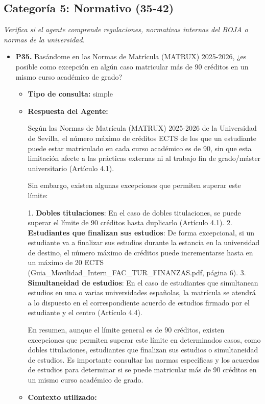 \documentclass{article}
\begin{document}
\subsection{Categoría 5: Normativo (35-42)}
\textit{Verifica si el agente comprende regulaciones, normativas internas del BOJA o normas de la universidad.}
\begin{itemize}
      \item \textbf{P35.} Basándome en las Normas de Matrícula (MATRUX) 2025-2026, ¿es posible como excepción en algún caso matricular más de 90 créditos en un mismo curso académico de grado? \\
            \begin{itemize}
                  \item \textbf{Tipo de consulta:} simple
                  \item \textbf{Respuesta del Agente:}

                        Según las Normas de Matrícula (MATRUX) 2025-2026 de la Universidad de Sevilla, el número máximo de créditos ECTS de los que un estudiante puede estar matriculado en cada curso académico es de 90, sin que esta limitación afecte a las prácticas externas ni al trabajo fin de grado/máster universitario (Artículo 4.1).

                        Sin embargo, existen algunas excepciones que permiten superar este límite:

                        1. \textbf{Dobles titulaciones}: En el caso de dobles titulaciones, se puede superar el límite de 90 créditos hasta duplicarlo (Artículo 4.1).
                        2. \textbf{Estudiantes que finalizan sus estudios}: De forma excepcional, si un estudiante va a finalizar sus estudios durante la estancia en la universidad de destino, el número máximo de créditos puede incrementarse hasta en un máximo de 20 ECTS (Guia\_Movilidad\_Intern\_FAC\_TUR\_FINANZAS.pdf, página 6).
                        3. \textbf{Simultaneidad de estudios}: En el caso de estudiantes que simultanean estudios en una o varias universidades españolas, la matrícula se atendrá a lo dispuesto en el correspondiente acuerdo de estudios firmado por el estudiante y el centro (Artículo 4.4).

                        En resumen, aunque el límite general es de 90 créditos, existen excepciones que permiten superar este límite en determinados casos, como dobles titulaciones, estudiantes que finalizan sus estudios o simultaneidad de estudios. Es importante consultar las normas específicas y los acuerdos de estudios para determinar si se puede matricular más de 90 créditos en un mismo curso académico de grado.
                  \item \textbf{Contexto utilizado:}


\end{itemize}
\end{itemize}
\end{document}
